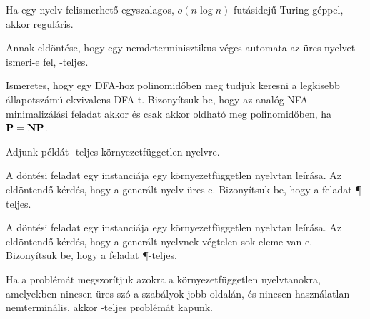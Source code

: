\begin{Exercise}[counter={sorszam}, difficulty=2]
Ha egy nyelv felismerhető egyszalagos, $o(n \log n )$ futásidejű Turing-géppel, akkor reguláris.
\end{Exercise}


\begin{Exercise}[counter={sorszam}, difficulty=0]
Annak eldöntése, hogy egy nemdeterminisztikus véges automata az üres nyelvet
ismeri-e fel, \NL-teljes.
\end{Exercise}


\begin{Exercise}[counter={sorszam}, difficulty=1]
Ismeretes, hogy egy DFA-hoz polinomidőben meg tudjuk keresni a legkisebb
állapotszámú ekvivalens DFA-t. Bizonyítsuk be, hogy az analóg NFA-minimalizálási feladat
akkor és csak akkor oldható meg polinomidőben, ha $\mbox{\ensuremath{\mathbf{P}}} = \mbox{\ensuremath{\mathbf{NP}}}$.

\end{Exercise}


\begin{Exercise}[counter={sorszam}, difficulty=1]
Adjunk példát \NL-teljes környezetfüggetlen nyelvre. 
\end{Exercise}


\begin{Exercise}[counter={sorszam}, difficulty=0]
A  döntési feladat egy instanciája  egy környezetfüggetlen nyelvtan leírása. Az eldöntendő kérdés, hogy a generált nyelv üres-e. Bizonyítsuk be, hogy a feladat \P-teljes.
\end{Exercise}


\begin{Exercise}[counter={sorszam}, difficulty=0]
A  döntési feladat egy instanciája egy környezetfüggetlen nyelvtan leírása. Az eldöntendő kérdés, hogy a generált nyelvnek végtelen sok eleme van-e. Bizonyítsuk be, hogy a feladat \P-teljes.
\end{Exercise}


\begin{Exercise}[counter={sorszam}, difficulty=0]
Ha a  problémát megszorítjuk azokra a környezetfüggetlen nyelvtanokra, amelyekben nincsen üres szó a szabályok jobb oldalán, és nincsen használatlan nemterminális, akkor \NL-teljes problémát kapunk. 
\end{Exercise}


